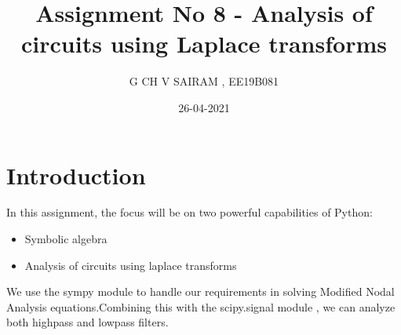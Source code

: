 \documentclass[11pt, a4paper]{article}
\title{Assignment No 8 - Analysis of circuits using Laplace transforms}
\author{G CH V SAIRAM , EE19B081}
\date{26-04-2021}
\begin{document}
		
		
\maketitle
\section*{Introduction}
In this assignment, the focus will be on two powerful capabilities of Python:
\begin{itemize}
  	\item Symbolic algebra
  	\item Analysis of circuits using laplace transforms
\end{itemize}
We use the sympy module to handle our requirements in solving Modified Nodal Analysis equations.Combining this with the scipy.signal module , we can analyze both highpass and lowpass filters.
\end{document}

